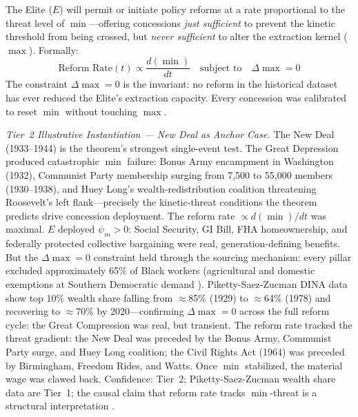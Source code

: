 \begin{definition}
The Elite ($E$) will permit or initiate policy reforms at a rate proportional to the threat level of $\min$---offering concessions \textit{just sufficient} to prevent the kinetic threshold from being crossed, but \textit{never sufficient} to alter the extraction kernel ($\max$). Formally:
\begin{equation}\label{eq:12.2-concession-theorem}
\text{Reform Rate}(t) \propto \frac{d(\min)}{dt} \quad \text{subject to} \quad \Delta\max = 0
\end{equation}
The constraint $\Delta\max = 0$ is the invariant: no reform in the historical dataset has ever reduced the Elite's extraction capacity. Every concession was calibrated to reset $\min$ without touching $\max$.
\end{definition}

\noindent\textit{Tier~2 Illustrative Instantiation --- New Deal as Anchor Case.} The New Deal (1933--1944) is the theorem's strongest single-event test. The Great Depression produced catastrophic $\min$ failure: Bonus Army encampment in Washington (1932), Communist Party membership surging from 7,500 to 55,000 members (1930--1938), and Huey Long's wealth-redistribution coalition threatening Roosevelt's left flank---precisely the kinetic-threat conditions the theorem predicts drive concession deployment. The reform rate $\propto d(\min)/dt$ was maximal. $E$ deployed $\psi_m > 0$: Social Security, GI Bill, FHA homeownership, and federally protected collective bargaining were real, generation-defining benefits. But the $\Delta\max = 0$ constraint held through the sourcing mechanism: every pillar excluded approximately 65\% of Black workers (agricultural and domestic exemptions at Southern Democratic demand \cite{katznelson_fear}). Piketty-Saez-Zucman DINA data \cite{piketty_saez_zucman_2018} show top 10\% wealth share falling from $\approx$85\% (1929) to $\approx$64\% (1978) and recovering to $\approx$70\% by 2020---confirming $\Delta\max = 0$ across the full reform cycle: the Great Compression was real, but transient. The reform rate tracked the threat gradient: the New Deal was preceded by the Bonus Army, Communist Party surge, and Huey Long coalition; the Civil Rights Act (1964) was preceded by Birmingham, Freedom Rides, and Watts. Once $\min$ stabilized, the material wage was clawed back. Confidence: Tier~2; Piketty-Saez-Zucman wealth share data are Tier~1; the causal claim that reform rate tracks $\min$-threat is a structural interpretation \cite{piven_cloward_1977}.

